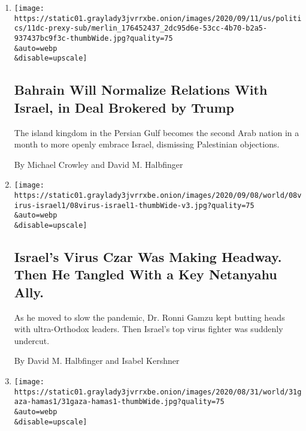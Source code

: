 \begin{enumerate}
\def\labelenumi{\arabic{enumi}.}
\item
  \href{/2020/09/11/world/middleeast/bahrain-israel-trump.html}{}

  \texttt{[image: https://static01.graylady3jvrrxbe.onion/images/2020/09/11/us/politics/11dc-prexy-sub/merlin\_176452437\_2dc95d6e-53cc-4b70-b2a5-937437bc9f3c-thumbWide.jpg?quality=75\\\&auto=webp\\\&disable=upscale]}

  \hypertarget{bahrain-will-normalize-relations-with-israel-in-deal-brokered-by-trump}{%
  \subsection{Bahrain Will Normalize Relations With Israel, in Deal
  Brokered by
  Trump}\label{bahrain-will-normalize-relations-with-israel-in-deal-brokered-by-trump}}

  The island kingdom in the Persian Gulf becomes the second Arab nation
  in a month to more openly embrace Israel, dismissing Palestinian
  objections.

  By Michael Crowley and David M. Halbfinger
\item
  \href{/2020/09/08/world/middleeast/israel-coronavirus-ronni-gamzu-netanyahu.html}{}

  \texttt{[image: https://static01.graylady3jvrrxbe.onion/images/2020/09/08/world/08virus-israel1/08virus-israel1-thumbWide-v3.jpg?quality=75\\\&auto=webp\\\&disable=upscale]}

  \hypertarget{israels-virus-czar-was-making-headway-then-he-tangled-with-a-key-netanyahu-ally}{%
  \subsection{Israel's Virus Czar Was Making Headway. Then He Tangled
  With a Key Netanyahu
  Ally.}\label{israels-virus-czar-was-making-headway-then-he-tangled-with-a-key-netanyahu-ally}}

  As he moved to slow the pandemic, Dr. Ronni Gamzu kept butting heads
  with ultra-Orthodox leaders. Then Israel's top virus fighter was
  suddenly undercut.

  By David M. Halbfinger and Isabel Kershner
\item
  \href{/2020/08/31/world/middleeast/hamas-gaza-israel-coronavirus.html}{}

  \texttt{[image: https://static01.graylady3jvrrxbe.onion/images/2020/08/31/world/31gaza-hamas1/31gaza-hamas1-thumbWide.jpg?quality=75\\\&auto=webp\\\&disable=upscale]}


\end{enumerate}
